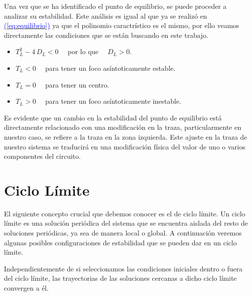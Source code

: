 \documentclass[12pt,a4paper]{report} %
\newcommand{\eref}[1]{\hyperref[#1]{\textcolor{blue}{(\ref*{#1})}}}
\newcommand{\eref}[1]{\hyperref[#1]{\textcolor{blue}{\textit{(\ref*{#1})}}}}
\begin{document}
\newpage
		
		 Una vez que se ha identificado el punto de equilibrio, se puede proceder a analizar su estabilidad. Este análisis es igual al que ya se realizó en \eref{eq:equilibrio} ya que el polinomio caractrístico es el mismo, por ello veamos directamente las condiciones que se están buscando en este trabajo.
		 
		\vspace{0.2cm}\begin{itemize}
			\item $T_L^2-4\,D_L<0\quad$ por lo que $\quad D_L>0$.
			\item $T_L<0\quad$ para tener un foco asíntoticamente estable.
			\item $T_L=0\quad$ para tener un centro.
			\item $T_L>0\quad$ para tener un foco asíntoticamente inestable.
		\end{itemize}\smallskip
		
		\vspace{0.5cm}Es evidente que un cambio en la estabilidad del punto de equilibrio está directamente relacionado con una modificación en la traza, particularmente en nuestro caso, se refiere a la traza en la zona izquierda. Este ajuste en la traza de nuestro sistema se traducirá en una modificación física del valor de uno o varios componentes del circuito.
		
		\section{Ciclo Límite}
		
		El siguiente concepto crucial que debemos conocer es el de ciclo límite. Un ciclo límite es una solución periódica del sistema que se encuentra aislada del resto de soluciones periódicas, ya sea de manera local o global. A continuación veremos algunas posibles configuraciones de estabilidad que se pueden dar en un ciclo límite.
		
		\newpage
		
		
		\vspace{0.5cm}Independientemente de si seleccionamos las condiciones iniciales dentro o fuera del ciclo límite, las trayectorias de las soluciones cercanas a dicho ciclo límite convergen a él.
		
\end{document}
